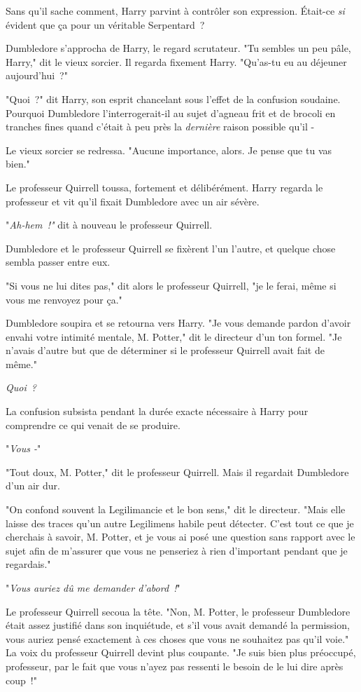 Sans qu'il sache comment, Harry parvint à contrôler son expression. Était-ce \emph{si} évident que ça pour un véritable Serpentard~?

Dumbledore s'approcha de Harry, le regard scrutateur. "Tu sembles un peu pâle, Harry," dit le vieux sorcier. Il regarda fixement Harry. "Qu'as-tu eu au déjeuner aujourd'hui~?"

"Quoi~?" dit Harry, son esprit chancelant sous l'effet de la confusion soudaine. Pourquoi Dumbledore l'interrogerait-il au sujet d'agneau frit et de brocoli en tranches fines quand c'était à peu près la \emph{dernière} raison possible qu'il -

Le vieux sorcier se redressa. "Aucune importance, alors. Je pense que tu vas bien."

Le professeur Quirrell toussa, fortement et délibérément. Harry regarda le professeur et vit qu'il fixait Dumbledore avec un air sévère.

"\emph{Ah-hem~!"} dit à nouveau le professeur Quirrell.

Dumbledore et le professeur Quirrell se fixèrent l'un l'autre, et quelque chose sembla passer entre eux.

"Si vous ne lui dites pas," dit alors le professeur Quirrell, "je le ferai, même si vous me renvoyez pour ça."

Dumbledore soupira et se retourna vers Harry. "Je vous demande pardon d'avoir envahi votre intimité mentale, M. Potter," dit le directeur d'un ton formel. "Je n'avais d'autre but que de déterminer si le professeur Quirrell avait fait de même."

\emph{Quoi~?}

La confusion subsista pendant la durée exacte nécessaire à Harry pour comprendre ce qui venait de se produire.

"\emph{Vous -}"

"Tout doux, M. Potter," dit le professeur Quirrell. Mais il regardait Dumbledore d'un air dur.

"On confond souvent la Legilimancie et le bon sens," dit le directeur. "Mais elle laisse des traces qu'un autre Legilimens habile peut détecter. C'est tout ce que je cherchais à savoir, M. Potter, et je vous ai posé une question sans rapport avec le sujet afin de m'assurer que vous ne penseriez à rien d'important pendant que je regardais."

"\emph{Vous auriez dû me demander d'abord~!}"

Le professeur Quirrell secoua la tête. "Non, M. Potter, le professeur Dumbledore était assez justifié dans son inquiétude, et s'il vous avait demandé la permission, vous auriez pensé exactement à ces choses que vous ne souhaitez pas qu'il voie." La voix du professeur Quirrell devint plus coupante. "Je suis bien plus préoccupé, professeur, par le fait que vous n'ayez pas ressenti le besoin de le lui dire après coup~!"

